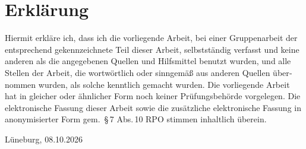 \chapter*{Erklärung}

\begin{otherlanguage}{ngerman}
\noindent
Hiermit erkläre ich, dass ich die vorliegende Arbeit, bei einer Gruppenarbeit der entsprechend gekennzeichnete Teil dieser Arbeit, selbstständig verfasst und keine anderen als die angegebenen Quellen und Hilfsmittel benutzt wurden, und alle Stellen der Arbeit, die wortwörtlich oder sinngemäß aus anderen Quellen übernommen wurden, als solche kenntlich gemacht wurden.
Die vorliegende Arbeit hat in gleicher oder ähnlicher Form noch keiner Prüfungsbehörde vorgelegen.
Die elektronische Fassung dieser Arbeit sowie die zusätzliche elektronische Fassung in anonymisierter Form gem.\ §\,7 Abs.\,10 RPO stimmen inhaltlich überein.
\end{otherlanguage}

\vspace{2.5cm}

\noindent
Lüneburg, 08.10.2026 \hfill \makebox[6cm]{\hrulefill}\\
\phantom{Lüneburg, 08.10.2026} \hfill {}
